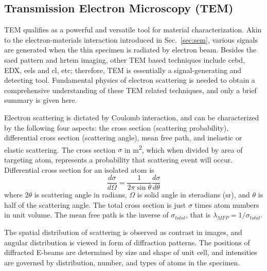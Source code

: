 \subsection{Transmission Electron Microscopy (TEM)}

TEM qualifies as a powerful and versatile tool for material characterization. Akin to the electron-materials interaction introduced in Sec.~\ref{sec:sem}, various signals are generated when the thin specimen is radiated by electron beam. Besides the \gls{saed} pattern and \gls{hrtem} imaging, other TEM based techniques include \gls{cebd}, EDX, \gls{eels} and \gls{cl}, etc; therefore, TEM is essentially a signal-generating and detecting tool.\cite{Williams2009} Fundamental physics of electron scattering is needed to obtain a comprehensive understanding of these TEM related techniques, and only a brief summary is given here.

Electron scattering is dictated by Coulomb interaction, and can be characterized by the following four aspects: the cross section (scattering probability), differential cross section (scattering angle), mean free path, and inelastic or elastic scattering. The cross section $\sigma$ in \si{m^2}, which when divided by area of targeting atom, represents a probability that scattering event will occur. Differential cross section for an isolated atom is 
\[
\frac{d\sigma}{d\Omega} = \frac{1}{2\pi \sin\theta} \frac{d\sigma}{d\theta}
\] 
where $2\theta$ is scattering angle in radians, $\Omega$ is solid angle in steradians (sr), and $\theta$ is half of the scattering angle. The total cross section is just $\sigma$ times atom numbers in unit volume. The mean free path is the inverse of $\sigma_{total}$, that is $\lambda_{MFP} = 1/\sigma_{total}$. 

The spatial distribution of scattering is observed as contrast in images, and angular distribution is viewed in form of diffraction patterns. The positions of diffracted E-beams are determined by size and shape of unit cell, and intensities are governed by distribution, number, and types of atoms in the specimen. 

